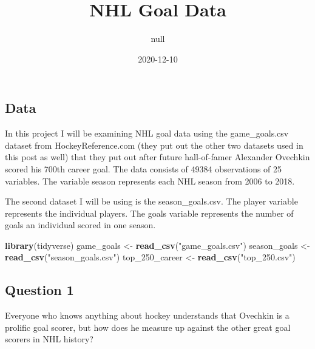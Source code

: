 \documentclass[
]{article}
\title{NHL Goal Data}
\author{null}
\date{2020-12-10}
\newenvironment{Shaded}{\begin{snugshade}}{\end{snugshade}}
\newcommand{\CommentTok}[1]{\textcolor[rgb]{0.56,0.35,0.01}{\textit{#1}}}
\newcommand{\DecValTok}[1]{\textcolor[rgb]{0.00,0.00,0.81}{#1}}
\newcommand{\KeywordTok}[1]{\textcolor[rgb]{0.13,0.29,0.53}{\textbf{#1}}}
\newcommand{\NormalTok}[1]{#1}
\newcommand{\OperatorTok}[1]{\textcolor[rgb]{0.81,0.36,0.00}{\textbf{#1}}}
\newcommand{\StringTok}[1]{\textcolor[rgb]{0.31,0.60,0.02}{#1}}
\begin{document}
\maketitle

\hypertarget{data}{%
\subsection{Data}\label{data}}

In this project I will be examining NHL goal data using the
game\_goals.csv dataset from HockeyReference.com (they put out the other
two datasets used in this post as well) that they put out after future
hall-of-famer Alexander Ovechkin scored his 700th career goal. The data
consists of 49384 observations of 25 variables. The variable season
represents each NHL season from 2006 to 2018.

The second dataset I will be using is the season\_goals.csv. The player
variable represents the individual players. The goals variable
represents the number of goals an individual scored in one season.

\begin{Shaded}
\begin{Highlighting}[]
\KeywordTok{library}\NormalTok{(tidyverse)}
\NormalTok{game_goals <-}\StringTok{ }\KeywordTok{read_csv}\NormalTok{(}\StringTok{"game_goals.csv"}\NormalTok{)}
\NormalTok{season_goals <-}\StringTok{ }\KeywordTok{read_csv}\NormalTok{(}\StringTok{"season_goals.csv"}\NormalTok{)}
\NormalTok{top_}\DecValTok{250}\NormalTok{_career <-}\StringTok{ }\KeywordTok{read_csv}\NormalTok{(}\StringTok{"top_250.csv"}\NormalTok{)}
\end{Highlighting}
\end{Shaded}

\hypertarget{question-1}{%
\subsection{Question 1}\label{question-1}}

Everyone who knows anything about hockey understands that Ovechkin is a
prolific goal scorer, but how does he measure up against the other great
goal scorers in NHL history?

\begin{Shaded}
\end{Shaded}
\end{document}
